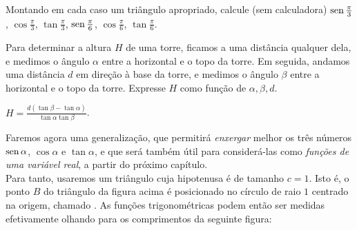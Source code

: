 \begin{exo}\label{exo:calculsimple60} Montando em cada caso um triângulo apropriado,
calcule (sem calculadora) $\operatorname{sen} \tfrac{\pi}{3}$, $\cos \tfrac{\pi}{3}$,
$\tan \tfrac{\pi}{3}$, $\operatorname{sen} \tfrac{\pi}{6}$, $\cos \tfrac{\pi}{6}$,
$\tan \tfrac{\pi}{6}$. 
\begin{sol}
\mbox{}

\begin{center}
\begin{bmlimage}\end{bmlimage}
\end{center}
\end{sol}
\end{exo}

\begin{exo}
Para determinar a altura $H$ de uma torre, 
ficamos a uma distância qualquer dela, e medimos o ângulo $\alpha$
entre a horizontal e o topo da torre. Em seguida, andamos uma distância
$d$ em direção à base da torre, e medimos o ângulo $\beta$
entre a horizontal e o topo da torre. 
Expresse $H$ como função de $\alpha,\beta,d$.
\begin{sol}
$H=\frac{d(\tan\beta-\tan\alpha)}{\tan \alpha\tan\beta}$.
\end{sol}
\end{exo}

Faremos agora uma generalização, que permitirá 
\emph{enxergar} melhor os três números $\operatorname{sen} \alpha$, $\cos \alpha$ e 
$\tan \alpha$,  e
que será também útil para considerá-las como \emph{funções de uma 
variável real}, a partir do próximo capítulo.\\

Para tanto, usaremos um triângulo cuja hipotenusa é de tamanho $c=1$. 
Isto é, o ponto $B$
do triângulo da
figura acima é posicionado no círculo de raio $1$ centrado na origem, 
chamado
. As funções 
trigonométricas
podem então ser medidas efetivamente olhando para os comprimentos da 
seguinte figura:

